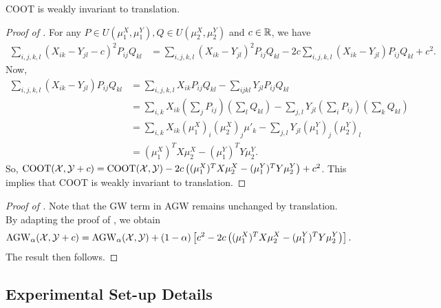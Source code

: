 \begin{lemma}
\label{prop:coot_invariant}
    COOT is weakly invariant to translation.
\end{lemma}
\begin{proof}[Proof of ]
For any $P \in U(\mu_1^X, \mu_1^Y), Q \in U(\mu_2^X, \mu_2^Y)$ and $c \in \mathbb R$, we have
\begin{align}
    \sum_{i,j,k,l} (X_{ik} - Y_{jl} - c)^2 P_{ij} Q_{kl}
    &= \sum_{i,j,k,l} (X_{ik} - Y_{jl})^2 P_{ij} Q_{kl}
    - 2c \sum_{i,j,k,l} (X_{ik} - Y_{jl}) P_{ij} Q_{kl} + c^2.
\end{align}
Now,
\begin{align}
    \sum_{i,j,k,l} (X_{ik} - Y_{jl}) P_{ij} Q_{kl}
    &= \sum_{i,j,k,l} X_{ik} P_{ij} Q_{kl} - \sum_{ijkl} Y_{jl} P_{ij} Q_{kl} \\
    &= \sum_{i,k} X_{ik} \left( \sum_j P_{ij} \right) \left( \sum_l Q_{kl} \right)
    - \sum_{j,l} Y_{jl} \left( \sum_i P_{ij} \right) \left( \sum_k Q_{kl} \right) \\
    &= \sum_{i,k} X_{ik} (\mu_1^X)_i (\mu_2^X)_j \mu'_k - \sum_{j,l} Y_{jl} (\mu_1^Y)_j (\mu_2^Y)_l \\
    &= (\mu_1^X)^T X \mu_2^X - (\mu_1^Y)^T Y \mu_2^Y.
\end{align}
So, $\text{COOT}(\mathcal X, \mathcal Y + c) = \text{COOT}(\mathcal X, \mathcal Y) -
2 c \left( (\mu_1^X)^T X \mu_2^X - (\mu_1^Y)^T Y \mu_2^Y \right) + c^2$.
This implies that COOT is weakly invariant to translation.
\end{proof}

\begin{proof}[Proof of ]
Note that the GW term in AGW remains unchanged by translation.
By adapting the proof of , we obtain
\begin{align}
    \text{AGW}_{\alpha}(\mathcal X, \mathcal Y + c) = \text{AGW}_{\alpha}(\mathcal X, \mathcal Y) + (1 - \alpha) \left[ c^2
    - 2 c \left( (\mu_1^X)^T X \mu_2^X - (\mu_1^Y)^T Y \mu_2^Y \right) \right].
\end{align}
The result then follows.
\end{proof}

\subsection{Experimental Set-up Details} \label{subsec:appendix_expe_agw}


